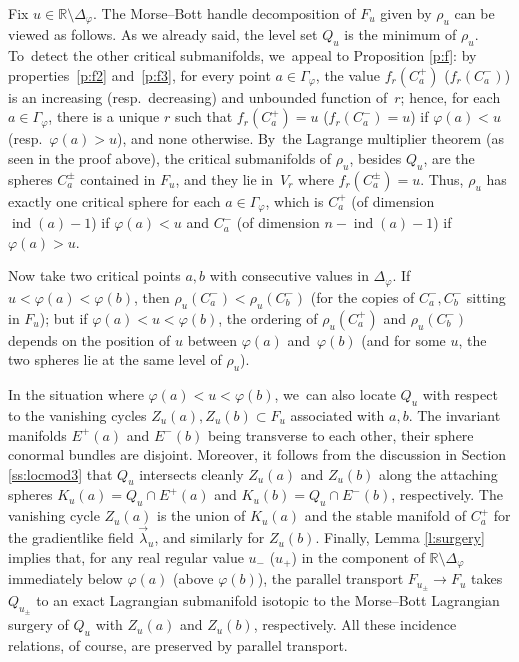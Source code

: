\documentclass[JEP,XML,SOM,Unicode]{cedram}
\newcommand{\R}{{\mathbb R}}
\newcommand{\Crit}{\Gamma_{\!\varphi}}
\newcommand{\Discr}{\Delta_\varphi}
\newcommand{\ind}{\operatorname{ind}}
\theoremstyle{plain}
\theoremstyle{definition}
\begin{document}
Fix $u \in \R \setminus \Discr$. The Morse--Bott handle decomposition of $F_u$ given by
$\rho_u$ can be viewed as follows. As we already said, the level set $Q_u$ is
the minimum of $\rho_u$. To~detect the other critical submanifolds, we~appeal
to Proposition \ref{p:f}: by properties~\eqref{p:f2} and~\eqref{p:f3}, for every point $a \in \Crit$,
the value $f_r(C_a^+)$ (\resp $f_r(C_a^-)$) is an increasing (resp.~decreasing)
and unbounded function of~$r$; hence, for each $a \in \Crit$, there is a unique
$r$ such that $f_r(C_a^+) = u$ (\resp $f_r(C_a^-) = u$) if $\varphi(a) < u$
(resp.~$\varphi(a) > u$), and none otherwise. By~the Lagrange multiplier theorem
(as seen in the proof above), the critical submanifolds of $\rho_u$, besides
$Q_u$, are the spheres $C_a^\pm$ contained in $F_u$, and they lie in~$V_r$ where
$f_r(C_a^\pm) = u$. Thus, $\rho_u$ has exactly one critical sphere for each $a
\in \Crit$, which is $C_a^+$ (of dimension $\ind(a)-1$) if $\varphi(a) < u$ and
$C_a^-$ (of dimension $n-\ind(a)-1$) if $\varphi(a) > u$.

Now take two critical points $a, b$ with consecutive values in $\Discr$. If \hbox{$u
< \varphi(a) < \varphi(b)$}, then $\rho_u(C_a^-) < \rho_u(C_b^-)$ (for the copies
of $C_a^-, C_b^-$ sitting in $F_u$); but if \hbox{$\varphi(a) \!<\! u \!<\! \varphi(b)$}, the
ordering of $\rho_u(C_a^+)$ and $\rho_u(C_b^-)$ depends on the position of $u$
between $\varphi(a)$ and~$\varphi(b)$ (and for some $u$, the two spheres lie at
the same level of $\rho_u$).

In the situation where $\varphi(a) < u < \varphi(b)$, we~can also locate $Q_u$
with respect to the vanishing cycles $Z_u(a), Z_u(b) \subset F_u$ associated
with $a, b$. The invariant manifolds $E^+(a)$ and $E^-(b)$ being transverse to
each other, their sphere conormal bundles are disjoint. Moreover, it follows
from the discussion in Section \ref{ss:locmod3} that $Q_u$ intersects cleanly
$Z_u(a)$ and $Z_u(b)$ along the attaching spheres $K_u(a) = Q_u \cap E^+(a)$ and
\hbox{$K_u(b) = Q_u \cap E^-(b)$}, respectively. The vanishing cycle $Z_u(a)$ is the
union of $K_u(a)$ and the stable manifold of $C_a^+$ for the gradientlike field
$\vec\lambda_u$, and similarly for $Z_u(b)$. Finally, Lemma \ref{l:surgery}
implies that, for any real regular value $u_-$ (\resp $u_+$) in the component
of $\R \setminus \Discr$ immediately below $\varphi(a)$ (\resp above $\varphi(b)$), the
parallel transport $F_{u_\pm} \to F_u$ takes $Q_{u_\pm}$ to an exact Lagrangian
submanifold isotopic to the Morse--Bott Lagrangian surgery of $Q_u$ with
$Z_u(a)$ and $Z_u(b)$, respectively. All these incidence relations, of course,
are preserved by parallel transport.
\end{document}
